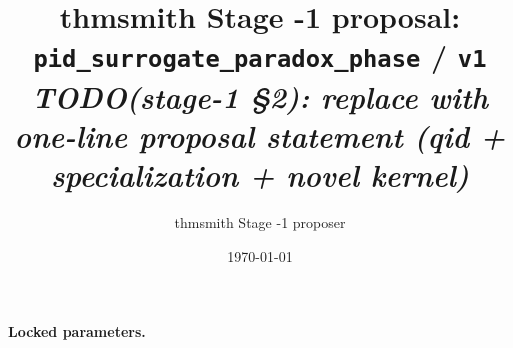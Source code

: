 \documentclass[11pt]{article}
\title{thmsmith Stage -1 proposal: \texttt{pid\_surrogate\_paradox\_phase} / \texttt{v1}%
  \\ \large\textit{TODO(stage-1 \S2): replace with one-line proposal statement (qid + specialization + novel kernel)}}
\author{thmsmith Stage -1 proposer}
\date{\today}
\theoremstyle{definition}
\theoremstyle{plain}
\theoremstyle{remark}
\begin{document}
\maketitle


\paragraph{Locked parameters.}

\begin{abstract}
\end{abstract}
\end{document}
